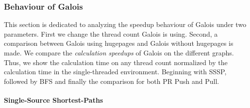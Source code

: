 

\subsubsection{Behaviour of Galois}
\label{sec:galois_speedup}
This section is dedicated to analyzing the speedup behaviour of Galois under two parameters. First we change the thread count Galois is using. Second, a comparison between Galois using hugepages and Galois without hugepages is made.
We compare the \emph{calculation speedups} of Galois on the different graphs. Thus, we show the calculation time on any thread count normalized by the calculation time in the single-threaded environment.
Beginning with SSSP, followed by BFS and finally the comparison for both PR Push and Pull.

\paragraph{Single-Source Shortest-Paths}
